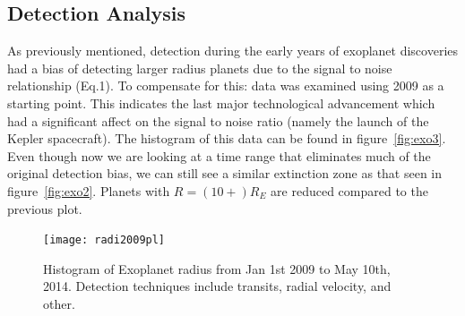\documentclass[
10pt, %
a4paper, %
oneside, %
headinclude,footinclude, %
BCOR5mm, %
]{scrartcl}
\begin{document}
\subsection{Detection Analysis}
As previously mentioned, detection during the early years of exoplanet discoveries had a bias of detecting larger radius planets due to the signal to noise relationship (Eq.1). To compensate for this: data was examined using 2009 as a starting point. This indicates the last major technological advancement which had a significant affect on the signal to noise ratio (namely the launch of the Kepler spacecraft). The histogram of this data can be found in figure~\vref{fig:exo3}. Even though now we are looking at a time range that eliminates much of the original detection bias, we can still see a similar extinction zone as that seen in figure~\vref{fig:exo2}. Planets with $R=(10+) R_{E}$ are reduced compared to the previous plot. 
\begin{figure}[tb]
\centering 
\texttt{[image: radi2009pl]} 
\caption[Exoplanet Radii]{Histogram of Exoplanet radius from Jan 1st 2009 to May 10th, 2014. Detection techniques include transits, radial velocity, and other.}
\label{fig:exo3} 
\end{figure}
\end{document}
